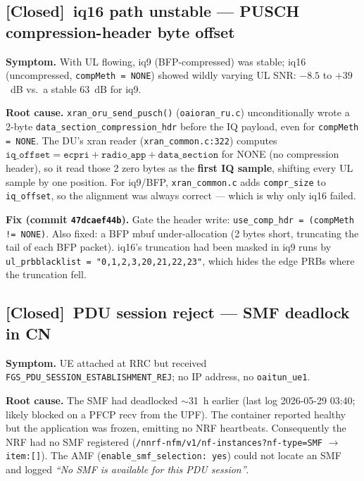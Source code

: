 \documentclass[11pt,a4paper]{article}
\newcommand{\closed}{\textcolor{closedcol}{\textbf{[Closed]}}}
\begin{document}
\subsection{\texorpdfstring{\closed}{[Closed]}\ iq16 path unstable --- PUSCH compression-header byte offset}

\textbf{Symptom.}
With UL flowing, iq9 (BFP-compressed) was stable; iq16 (uncompressed,
\texttt{compMeth = NONE}) showed wildly varying UL SNR: $-8.5$ to $+39$~dB vs.\ a stable
63~dB for iq9.

\textbf{Root cause.}
\texttt{xran_oru_send_pusch()} (\texttt{oaioran_ru.c}) unconditionally wrote a 2-byte
\texttt{data_section_compression_hdr} before the IQ payload, even for \texttt{compMeth =
NONE}. The DU's xran reader (\texttt{xran_common.c:322}) computes
$\texttt{iq\_offset} = \texttt{ecpri} + \texttt{radio\_app} + \texttt{data\_section}$ for
NONE (no compression header), so it read those 2 zero bytes as the \textbf{first IQ sample},
shifting every UL sample by one position. For iq9/BFP, \texttt{xran_common.c} adds
\texttt{compr\_size} to \texttt{iq\_offset}, so the alignment was always correct --- which is
why only iq16 failed.

\textbf{Fix (commit \texttt{47dcaef44b}).}
Gate the header write: \texttt{use\_comp\_hdr = (compMeth != NONE)}.
Also fixed: a BFP mbuf under-allocation (2 bytes short, truncating the tail of each BFP
packet). iq16's truncation had been masked in iq9 runs by
\texttt{ul\_prbblacklist = "0,1,2,3,20,21,22,23"}, which hides the edge PRBs where the
truncation fell.

\subsection{\texorpdfstring{\closed}{[Closed]}\ PDU session reject --- SMF deadlock in CN}

\textbf{Symptom.}
UE attached at RRC but received \texttt{FGS\_PDU\_SESSION\_ESTABLISHMENT\_REJ}; no IP
address, no \texttt{oaitun\_ue1}.

\textbf{Root cause.}
The SMF had deadlocked $\sim$31~h earlier (last log 2026-05-29 03:40; likely blocked on a PFCP
recv from the UPF). The container reported healthy but the application was frozen, emitting
no NRF heartbeats. Consequently the NRF had no SMF registered
(\texttt{/nnrf-nfm/v1/nf-instances?nf-type=SMF} $\rightarrow$ \texttt{item:[]}). The AMF
(\texttt{enable\_smf\_selection: yes}) could not locate an SMF and logged \emph{``No SMF is
available for this PDU session''}.
\end{document}
